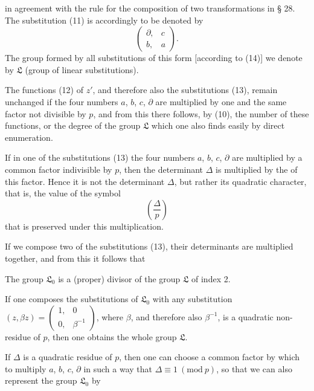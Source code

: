 in agreement with the rule for the composition of two transformations in § 28. The substitution (11) is accordingly to be denoted by
\[
\begin{pmatrix} \partial, & c \\ b, & a \end{pmatrix}.
\]
The group formed by all substitutions of this form [according to (14)] we denote by $\mathfrak{L}$ (group of linear substitutions).

The functions (12) of $z'$, and therefore also the substitutions (13), remain unchanged if the four numbers $a$, $b$, $c$, $\partial$ are multiplied by one and the same factor not divisible by $p$, and from this there follows, by (10), the number of these functions, or the degree of the group $\mathfrak{L}$
which one also finds easily by direct enumeration.

If in one of the substitutions (13) the four numbers $a$, $b$, $c$, $\partial$ are multiplied by a common factor indivisible by $p$, then the determinant $\Delta$ is multiplied by the  of this factor. Hence it is not the determinant $\Delta$, but rather its quadratic character, that is, the value of the symbol
\[
\left(\frac{\Delta}{p}\right)
\]
that is preserved under this multiplication.

If we compose two of the substitutions (13), their determinants are multiplied together, and from this it follows that 

The group $\mathfrak{L}_0$ is a (proper) divisor of the group $\mathfrak{L}$ of index 2.

If one composes the substitutions of $\mathfrak{L}_0$ with any substitution $(z, \beta z) = \begin{pmatrix} 1, & 0 \\ 0, & \beta^{-1} \end{pmatrix}$, where $\beta$, and therefore also $\beta^{-1}$, is a quadratic non-residue of $p$, then one obtains the whole group $\mathfrak{L}$.

If $\Delta$ is a quadratic residue of $p$, then one can choose a common factor by which to multiply $a$, $b$, $c$, $\partial$ in such a way that $\Delta \equiv 1 \ (\mathrm{mod}\ p)$, so that we can also represent the group $\mathfrak{L}_0$ by
